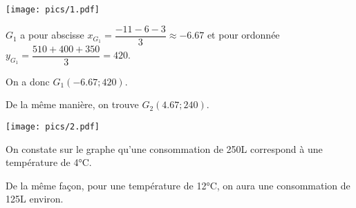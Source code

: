 \documentclass[a4paper,12pt]{scrartcl}
\begin{document}

\texttt{[image: pics/1.pdf]}


$G_1$ a pour abscisse $x_{G_1} = \dfrac{-11-6-3}{3} \approx -6.67$ et pour ordonnée $y_{G_1} = \dfrac{510+400+350}{3} = 420$.

On a donc $G_1(-6.67;420)$.

De la même manière, on trouve $G_2(4.67;240)$.

\question{}

\texttt{[image: pics/2.pdf]}


\subquestion{}
On constate sur le graphe qu'une consommation de 250L correspond à une température de 4°C.

\subquestion{}
De la même façon, pour une température de 12°C, on aura une consommation de 125L environ.

\trait
\end{document}
